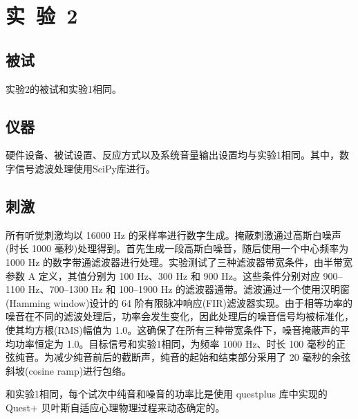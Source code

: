 \documentclass[jou,12pt,floatsintext]{apa7} %
\begin{document}
\section{实\ 验\ 2}

\subsection{\heiti 被试}
\vspace{-1em}

实验2的被试和实验1相同。

\subsection{\heiti 仪器}
\vspace{-1em}

硬件设备、被试设置、反应方式以及系统音量输出设置均与实验1相同。其中，数字信号滤波处理使用SciPy库进行。

\subsection{\heiti 刺激}
\vspace{-1em}

所有听觉刺激均以 16000 Hz 的采样率进行数字生成。掩蔽刺激通过高斯白噪声(时长 1000 毫秒)处理得到。首先生成一段高斯白噪音，随后使用一个中心频率为 1000 Hz 的数字带通滤波器进行处理。实验测试了三种滤波器带宽条件，由半带宽参数 A 定义，其值分别为 100 Hz、300 Hz 和 900 Hz。这些条件分别对应 900–1100 Hz、700–1300 Hz 和 100–1900 Hz 的滤波器通带。滤波通过一个使用汉明窗(Hamming window)设计的 64 阶有限脉冲响应(FIR)滤波器实现。由于相等功率的噪音在不同的滤波处理后，功率会发生变化，因此处理后的噪音信号均被标准化，使其均方根(RMS)幅值为 1.0。这确保了在所有三种带宽条件下，噪音掩蔽声的平均功率恒定为 1.0。目标信号和实验1相同，为频率 1000 Hz、时长 100 毫秒的正弦纯音。为减少纯音前后的截断声，纯音的起始和结束部分采用了 20 毫秒的余弦斜坡(cosine ramp)进行包络。

和实验1相同，每个试次中纯音和噪音的功率比是使用 questplus 库中实现的 Quest+ 贝叶斯自适应心理物理过程来动态确定的。
\end{document}
